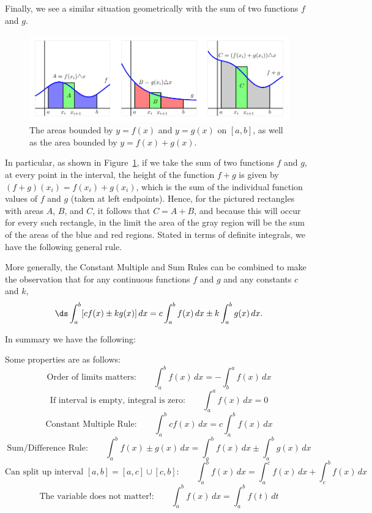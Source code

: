 Finally, we see a similar situation geometrically with the sum of two functions $f$ and $g$.
\begin{figure}[h]
\begin{center}
\includegraphics{figures/4_3_Sum}
\caption{The areas bounded by $y = f(x)$ and $y = g(x)$ on $[a,b]$, as well as the area bounded by $y = f(x) + g(x)$.} \label{F:4.3.Sum}
\end{center}
\end{figure}
In particular, as shown in Figure~\ref{F:4.3.Sum}, if we take the sum of two functions $f$ and $g$, at every point in the interval, the height of the function $f+g$ is given by $(f+g)(x_i) = f(x_i) + g(x_i)$, which is the sum of the individual function values of $f$ and $g$ (taken at left endpoints).  Hence, for the pictured rectangles with areas $A$, $B$, and $C$, it follows that $C = A + B$, and because this will occur for every such rectangle, in the limit the area of the gray region will be the sum of the areas of the blue and red regions.  Stated in terms of definite integrals, we have the following general rule.

\vspace*{5pt}
\noindent {}
\vspace*{1pt}

More generally, the Constant Multiple and Sum Rules can be combined to make the observation that for any continuous functions $f$ and $g$ and any constants $c$ and $k$,
$$\ds \int_a^b [c f(x) \pm k g(x)] \,dx = c \int_a^b f(x) \,dx \pm k \int_a^b g(x) \,dx.$$

In summary we have the following:

\begin{formulabox}
Some properties are as follows:
$$\mbox{Order of limits matters:}\qquad\int_a^b f(x)\,dx=-\int_b^a f(x)\,dx$$
$$\mbox{If interval is empty, integral is zero:}\qquad\int_a^a f(x)\,dx=0$$
$$\mbox{Constant Multiple Rule:}\qquad\int_a^b cf(x)\,dx=c\int_a^b f(x)\,dx$$
$$\mbox{Sum/Difference Rule:}\qquad\int_a^b f(x)\pm g(x)\,dx=\int_a^b f(x)\,dx\pm\int_a^b g(x)\,dx$$
$$\mbox{Can split up interval $[a,b]=[a,c]\cup[c,b]$:}\qquad\int_a^b f(x)\,dx=\int_a^c f(x)\,dx+\int_c^b f(x)\,dx$$
$$\mbox{The variable does not matter!:}\qquad\int_a^b f(x)\,dx=\int_a^b f(t)\,dt$$
\end{formulabox}

